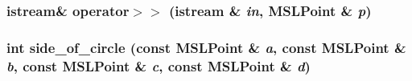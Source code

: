 \subsubsection{\setlength{\rightskip}{0pt plus 5cm}istream\& operator$>$$>$ (istream \& {\em in}, {\bf MSLPoint} \& {\em p})}\label{point_C_a3}


\subsubsection{\setlength{\rightskip}{0pt plus 5cm}int side\_\-of\_\-circle (const {\bf MSLPoint} \& {\em a}, const {\bf MSLPoint} \& {\em b}, const {\bf MSLPoint} \& {\em c}, const {\bf MSLPoint} \& {\em d})}\label{point_C_a1}


